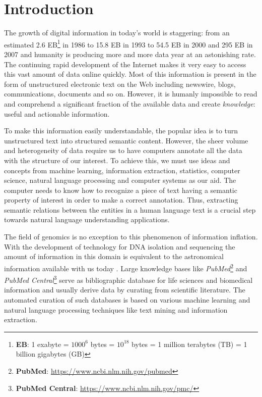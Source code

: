
\chapter{Introduction}
\label{chapter:introduction}

The growth of digital information in today's world is staggering: from an estimated 2.6 EB\footnote{\textbf{EB}: 1 exabyte = $1000^6$ bytes = $10^{18}$ bytes = 1 million terabytes (TB) = 1 billion gigabytes (GB)} in 1986 to 15.8 EB in 1993 to 54.5 EB in 2000 and 295 EB in 2007 \cite{hilbert2011world} and humanity is producing more and more data year at an astonishing rate. The continuing rapid development of the Internet makes it very easy to access this vast amount of data online quickly. Most of this information is present in the form of unstructured electronic text on the Web including newswire, blogs, communications, documents and so on. However, it is humanly impossible to read and comprehend a significant fraction of the available data and create {\it knowledge}: useful and actionable information.

To make this information easily understandable, the popular idea is to turn unstructured text into structured semantic content. However, the sheer volume and heterogeneity of data require us to have computers annotate all the data with the structure of our interest. To achieve this, we must use ideas and concepts from machine learning, information extraction, statistics, computer science, natural language processing and computer systems as our aid. The computer needs to know how to recognize a piece of text having a semantic property of interest in order to make a correct annotation. Thus, extracting semantic relations between the entities in a human language text is a crucial step towards natural language understanding applications.

The field of genomics is no exception to this phenomenon of information inflation. With the development of technology for DNA isolation and sequencing the amount of information in this domain is equivalent to the astronomical information available with us today \cite{stephens2015big}.  Large knowledge bases like {\it PubMed}\footnote{\textbf{PubMed}: \url{https://www.ncbi.nlm.nih.gov/pubmed}} and {\it PubMed Central}\footnote{\textbf{PubMed Central}: \url{https://www.ncbi.nlm.nih.gov/pmc/}} serve as bibliographic database for life sciences and biomedical information and usually derive data by curating from scientific literature. The automated curation of such databases is based on various machine learning and natural language processing techniques like text mining and information extraction.

